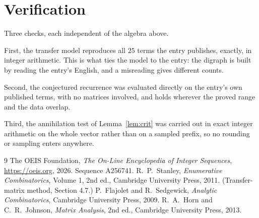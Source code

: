 \documentclass[11pt,a4paper]{article}
\theoremstyle{plain}
\theoremstyle{definition}
\begin{document}
\section{Verification}

Three checks, each independent of the algebra above.

First, the transfer model reproduces all $25$ terms the entry publishes, exactly, in
integer arithmetic. This is what ties the model to the entry: the digraph is built by reading
the entry's English, and a misreading gives different counts.

Second, the conjectured recurrence was evaluated directly on the entry's own published terms,
with no matrices involved, and holds wherever the proved range and the data overlap.

Third, the annihilation test of Lemma~\ref{lem:crit} was carried out in exact integer
arithmetic on the whole vector rather than on a sampled prefix, so no rounding or sampling
enters anywhere.

\begin{thebibliography}{9}
 The OEIS Foundation, \emph{The On-Line Encyclopedia of Integer
Sequences}, \url{https://oeis.org}, 2026. Sequence A256741.
 R.~P.~Stanley, \emph{Enumerative Combinatorics}, Volume 1, 2nd ed.,
Cambridge University Press, 2011. (Transfer-matrix method, Section 4.7.)
 P.~Flajolet and R.~Sedgewick, \emph{Analytic Combinatorics}, Cambridge
University Press, 2009.
 R.~A.~Horn and C.~R.~Johnson, \emph{Matrix Analysis}, 2nd ed., Cambridge
University Press, 2013.
\end{thebibliography}
\end{document}
